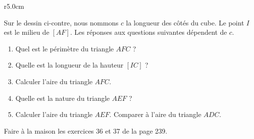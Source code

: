 
\begin{exercice}\label{exosmath-0115}

\begin{wrapfigure}{r}{5.0cm}
   \vspace{-0.5cm}        %
   \centering
   
\end{wrapfigure}

    Sur le dessin ci-contre, nous nommons \( c\) la longueur des côtés du cube. Le point \( I\) est le milieu de \( [AF]\). Les réponses aux questions suivantes dépendent de \( c\).

        \begin{enumerate}
            \item
                Quel est le périmètre du triangle \( AFC\) ?
            \item
                Quelle est la longueur de la hauteur \( [IC]\) ?
            \item
                Calculer l'aire du triangle \( AFC\).
            \item
                Quelle est la nature du triangle \( AEF\) ?
            \item
                Calculer l'aire du triangle \( AEF\). Comparer à l'aire du triangle \( ADC\).
        \end{enumerate}

        Faire à la maison les exercices 36 et 37 de la page 239.

\end{exercice}
